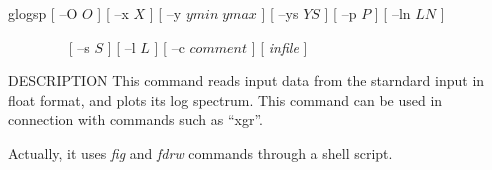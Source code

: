 
\begin{synopsis}
\item[glogsp] [ --O $O$ ] [ --x $X$ ] [ --y $ymin \; ymax$ ] [ --ys $YS$ ] 
              [ --p $P$ ] [ --ln $LN$ ] 
\item[\ ~~~~~~~] [ --s $S$ ] [ --l $L$ ] [ --c $comment$ ] [ {\em infile} ]
\end{synopsis}

\begin{qsection}{DESCRIPTION}
This command reads input data from the starndard input in float format,
and plots its log spectrum.
This command can be used in connection with commands such as ``xgr''.
\par
Actually, it uses {\em fig} and {\em fdrw} commands through a
shell script.
\end{qsection}

